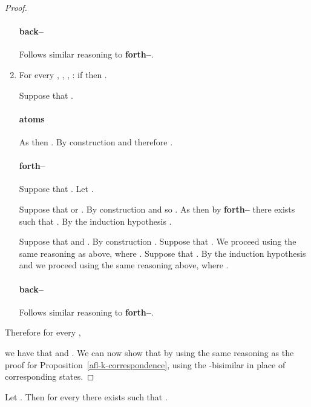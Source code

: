 \documentclass[twoside]{aiml14}
\begin{document}
\begin{proof}
\begin{enumerate}
              \paragraph{back--} Follows similar reasoning to {\bf forth--}.

          \item 
              For every , , , : if  then .

              Suppose that . 

              \paragraph{atoms} As  
              then . 
              By construction  
              and therefore .

              \paragraph{forth--} Suppose that .
              Let .

              Suppose that  or .
              By construction 
              and so . 
              As 
              then by {\bf forth--} there exists  such that
              .
              By the induction hypothesis .

              Suppose that  and . 
              By construction . 
              Suppose that . 
              We proceed using the same reasoning as above, where . 
              Suppose that .
              By the induction hypothesis 
              and we proceed using the same reasoning above, where .

              \paragraph{back--} Follows similar reasoning to {\bf forth--}.
      \end{enumerate}

      Therefore for every , 
      
      we have that 
      and .
      We can now show that  
      by using the same reasoning as the proof for Proposition~\ref{afl-k-correspondence}, 
      using the -bisimilar  
      in place of corresponding  states.
  \end{proof}

  \begin{corollary}
      Let .
      Then for every 
      there exists  
      such that .
  \end{corollary}
\end{document}
